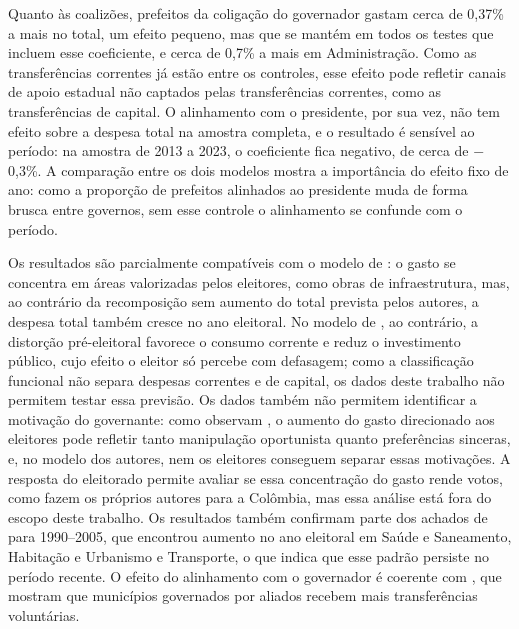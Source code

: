 Quanto às coalizões, prefeitos da coligação do governador gastam cerca de 0,37\% a mais no total, um efeito pequeno, mas que se mantém em todos os testes que incluem esse coeficiente, e cerca de 0,7\% a mais em Administração. Como as transferências correntes já estão entre os controles, esse efeito pode refletir canais de apoio estadual não captados pelas transferências correntes, como as transferências de capital. O alinhamento com o presidente, por sua vez, não tem efeito sobre a despesa total na amostra completa, e o resultado é sensível ao período: na amostra de 2013 a 2023, o coeficiente fica negativo, de cerca de $-$0,3\%. A comparação entre os dois modelos mostra a importância do efeito fixo de ano: como a proporção de prefeitos alinhados ao presidente muda de forma brusca entre governos, sem esse controle o alinhamento se confunde com o período.

Os resultados são parcialmente compatíveis com o modelo de \textcite{drazen2010}: o gasto se concentra em áreas valorizadas pelos eleitores, como obras de infraestrutura, mas, ao contrário da recomposição sem aumento do total prevista pelos autores, a despesa total também cresce no ano eleitoral. No modelo de \textcite{rogoff1990}, ao contrário, a distorção pré-eleitoral favorece o consumo corrente e reduz o investimento público, cujo efeito o eleitor só percebe com defasagem; como a classificação funcional não separa despesas correntes e de capital, os dados deste trabalho não permitem testar essa previsão. Os dados também não permitem identificar a motivação do governante: como observam \textcite{drazen2010}, o aumento do gasto direcionado aos eleitores pode refletir tanto manipulação oportunista quanto preferências sinceras, e, no modelo dos autores, nem os eleitores conseguem separar essas motivações. A resposta do eleitorado permite avaliar se essa concentração do gasto rende votos, como fazem os próprios autores para a Colômbia, mas essa análise está fora do escopo deste trabalho. Os resultados também confirmam parte dos achados de \textcite{sakurai2009} para 1990--2005, que encontrou aumento no ano eleitoral em Saúde e Saneamento, Habitação e Urbanismo e Transporte, o que indica que esse padrão persiste no período recente. O efeito do alinhamento com o governador é coerente com \textcite{ferreira2007}, que mostram que municípios governados por aliados recebem mais transferências voluntárias.

